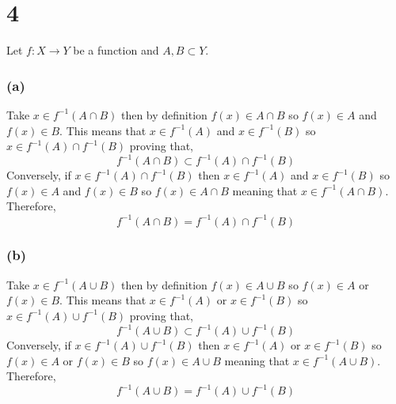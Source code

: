 \documentclass[12pt]{article}
\begin{document}
\section*{4}

Let $f : X \to Y$ be a function and $A, B \subset Y$.

\subsubsection*{(a)}

Take $x \in f^{-1}(A \cap B)$ then by definition $f(x) \in A \cap B$ so $f(x) \in A$ and $f(x) \in B$. This means that $x \in f^{-1}(A)$ and $x \in f^{-1}(B)$ so $x \in f^{-1}(A) \cap f^{-1}(B)$ proving that,
\[ f^{-1}(A \cap B) \subset f^{-1}(A) \cap f^{-1}(B) \]
Conversely, if $x \in f^{-1}(A) \cap f^{-1}(B)$ then $x \in f^{-1}(A)$ and $x \in f^{-1}(B)$ so $f(x) \in A$ and $f(x) \in B$ so $f(x) \in A \cap B$ meaning that $x \in f^{-1}(A \cap B)$. Therefore,
\[ f^{-1}(A \cap B) = f^{-1}(A) \cap f^{-1}(B) \]

\subsubsection*{(b)}

Take $x \in f^{-1}(A \cup B)$ then by definition $f(x) \in A \cup B$ so $f(x) \in A$ or $f(x) \in B$. This means that $x \in f^{-1}(A)$ or $x \in f^{-1}(B)$ so $x \in f^{-1}(A) \cup f^{-1}(B)$ proving that,
\[ f^{-1}(A \cup B) \subset f^{-1}(A) \cup f^{-1}(B) \]
Conversely, if $x \in f^{-1}(A) \cup f^{-1}(B)$ then $x \in f^{-1}(A)$ or $x \in f^{-1}(B)$ so $f(x) \in A$ or $f(x) \in B$ so $f(x) \in A \cup B$ meaning that $x \in f^{-1}(A \cup B)$. Therefore,
\[ f^{-1}(A \cup B) = f^{-1}(A) \cup f^{-1}(B) \]
\end{document}
